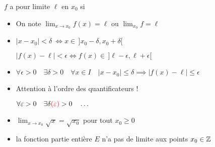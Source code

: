 \begin{frame}

$f$ a pour limite $\ell$ en $x_0$ si 

\pause

\begin{remarque}
\begin{itemize}
  \item On note \quad $\displaystyle\lim_{x\to x_0}f(x)=\ell$  \quad ou  \quad $\displaystyle\lim_{x_0} f=\ell$  
\pause

  \item $\vert x-x_0\vert <\delta \  \iff  x \in \, ]x_0 - \delta, x_0+\delta[$ 
  \pause
  
 $\vert f(x)-\ell\vert <\epsilon \iff   f(x) \in \, ]\ell - \epsilon, \ell+\epsilon[$
\pause
 
  \item $\forall \epsilon>0 \quad \exists \delta>0 \quad \forall x\in I \quad \vert x-x_0\vert \le \delta 
\implies \vert f(x)-\ell\vert \le \epsilon$
\pause

  \item Attention à l'ordre des quantificateurs ! 
  
  \pause $\forall \epsilon>0 \quad \exists   \delta{\color{red}(\epsilon)} >0 \quad \ldots$

  \end{itemize}
\end{remarque}
 
\end{frame}



\begin{frame}

\begin{exemple}
\begin{itemize}
\item $\displaystyle\lim_{x\to x_0} \sqrt{x} = \sqrt{x_0}$ pour tout $x_0\geq0$
\pause

\item {}la fonction partie entière $E$ n'a pas de limite aux points $x_0\in\Zz$
\end{itemize}
\end{exemple}

\pause\pause
{}

  
\end{frame}



